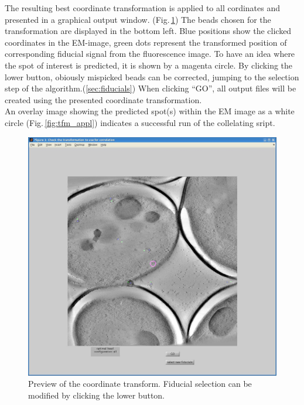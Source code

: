 \documentclass[10pt,a4paper,onepage,DIV12]{scrartcl}
\begin{document}
% 

The resulting best coordinate transformation is applied to all cordinates and presented in a graphical output window. (Fig.\,\ref{fig:tfm_select}) The beads chosen for the transformation are displayed in the bottom left. Blue positions show the clicked coordinates in the EM-image, green dots represent the transformed position of corresponding fiducial signal from the fluorescence image. To have an idea where the spot of interest is predicted, it is shown by a magenta circle. By clicking the lower button, obiously mispicked beads can be corrected, jumping to the selection step of the algorithm.(\ref{sec:fiducials}) When clicking ``GO'', all output files will be created using the presented coordinate transformation.\\
An overlay image showing the predicted spot(s) within the EM image as a white circle (Fig.\,\ref{fig:tfm_appl}) indicates a successful run of the collelating sript.
\begin{figure}
 \centering
 \includegraphics[width=.7\textwidth]{images/tfm_select.jpg}
 \caption{Preview of the coordinate transform. Fiducial selection can be modified by clicking the lower button.}
 \label{fig:tfm_select}
\end{figure}
\end{document}
